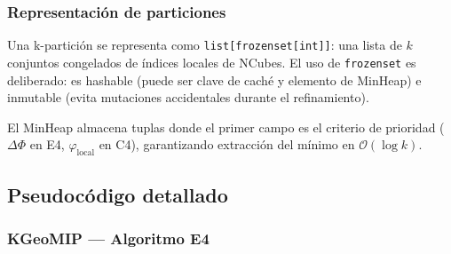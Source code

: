 \subsubsection*{Representación de particiones}

Una k-partición se representa como \texttt{list[frozenset[int]]}: una lista de
$k$ conjuntos congelados de índices locales de NCubes. El uso de \texttt{frozenset}
es deliberado: es hashable (puede ser clave de caché y elemento de MinHeap) e inmutable
(evita mutaciones accidentales durante el refinamiento).

El MinHeap almacena tuplas donde el primer campo es el criterio de prioridad
($\Delta\Phi$ en E4, $\varphi_{\text{local}}$ en C4), garantizando extracción del
mínimo en $\mathcal{O}(\log k)$.

\subsection{Pseudocódigo detallado}

\subsubsection*{KGeoMIP — Algoritmo E4}

